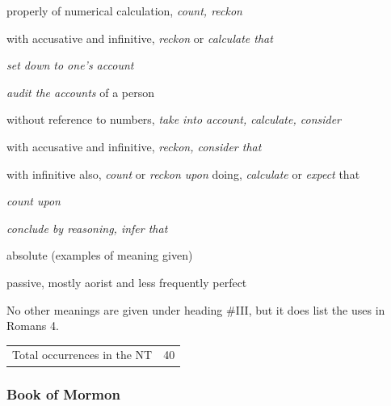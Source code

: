 \begin{compactdesc}
						\begin{compactitem}
							\item[I.1] properly of numerical calculation, \textit{count, reckon}
							\item[I.2] with accusative and infinitive, \textit{reckon} or \textit{calculate that}
							\item[I.3.a] \textit{set down to one's account}
							\item[I.3.b] \textit{audit the accounts} of a person
							\item[II.1] without reference to numbers, \textit{take into account, calculate, consider}
							\item[II.2] with accusative and infinitive, \textit{reckon, consider that}
							\item[II.3] with infinitive also, \textit{count} or \textit{reckon upon} doing, \textit{calculate} or \textit{expect} that
							\item[II.4] \textit{count upon}
							\item[II.5] \textit{conclude by reasoning, infer that}
							\item[II.6] absolute (examples of meaning given)
							\item[III] passive, mostly aorist and less frequently perfect
								\begin{compactitem}
									\item No other meanings are given under heading \#III, but it does list the uses in Romans 4.
								\end{compactitem}
						\end{compactitem}
				\end{compactdesc}
				
				\begin{tabular}{ll}
					Total occurrences in the NT & 40
				\end{tabular}
				
		
	\subsubsection{Book of Mormon} %
		\label{COUNT-BOM}
	
